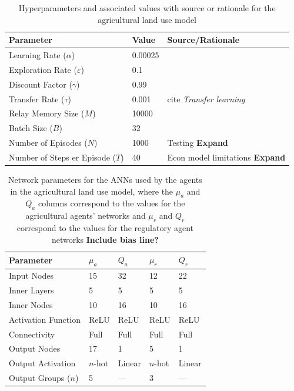 \begin{table}
\centering
\caption{Hyperparameters and associated values with source or rationale
    for the agricultural land use model}
\label{tab:farm_ex_hyer}
\begin{tabular}{lll}
\hline
Parameter & Value & Source/Rationale \\
\hline
    Learning Rate ($\alpha$) & 0.00025 & \\
    Exploration Rate ($\varepsilon$) & 0.1 & \\
    Discount Factor ($\gamma$) & 0.99 & \\
    Transfer Rate ($\tau$) & 0.001 & cite \emph{Transfer learning} \\
    Relay Memory Size ($M$) & 10000 & \\
    Batch Size ($B$) & 32 & \cite{ddqn16} \\
    Number of Episodes ($N$) & 1000 & Testing \textbf{Expand} \\
    Number of Steps er Episode ($T$) & 40 
    & Econ model limitations \textbf{Expand} \\
\hline
\end{tabular}
\end{table}

\begin{table}
\centering
\caption{Network parameters for the ANNs used by the agents in the agricultural
land use model, where the $\mu_a$ and $Q_a$ columns correspond to the values
for the agricultural agents' networks and $\mu_r$ and $Q_r$ 
correspond to the values for the regulatory agent networks
\textbf{Include bias line?}}
\label{tab:farm_ex_nets}
\begin{tabular}{lllll}
    \hline
    Parameter & $\mu_a$ & $Q_a$ & $\mu_r$ & $Q_r$ \\
    \hline
    Input Nodes & 15 & 32 & 12 & 22 \\
    Inner Layers & 5 & 5 & 5 & 5 \\
    Inner Nodes & 10 & 16 & 10 & 16 \\
    Activation Function & ReLU & ReLU & ReLU & ReLU \\
    Connectivity & Full & Full & Full & Full \\
    Output Nodes & 17 & 1 & 5 & 1 \\
    Output Activation & $n$-hot & Linear & $n$-hot & Linear \\
    Output Groups ($n$) & 5 & --- & 3 & --- \\
    \hline
\end{tabular}
\end{table}

